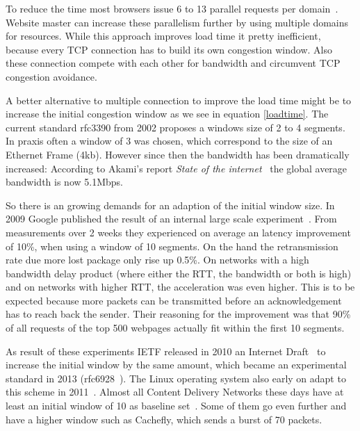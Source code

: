 To reduce the time most browsers issue 6 to 13 parallel requests per
domain~\cite{browserscope}. Website master can increase these parallelism
further by using multiple domains for resources. While this approach improves
load time it pretty inefficient, because every TCP connection has to build its
own congestion window. Also these connection compete with each other for
bandwidth and circumvent TCP congestion avoidance.

A better alternative to multiple connection to improve the load time might be to
increase the initial congestion window as we see in equation \ref{loadtime}. The
current standard rfc3390 from 2002 proposes a windows size of 2 to 4 segments.
In praxis often a window of 3 was chosen, which correspond to the size of an
Ethernet Frame (4kb). However since then the bandwidth has been dramatically
increased: According to Akami's report \emph{State of the
internet}~\cite{q3-2015-soti-connectivity-final} the global average bandwidth is
now 5.1Mbps.

So there is an growing demands for an adaption of the initial window size. In
2009 Google published the result of an internal large scale
experiment~\cite{36640}. From measurements over 2 weeks they experienced on
average an latency improvement of 10\%, when using a window of 10 segments. On
the hand the retransmission rate due more lost package only rise up 0.5\%. On
networks with a high bandwidth delay product (where either the RTT, the
bandwidth or both is high) and on networks with higher RTT, the acceleration was
even higher. This is to be expected because more packets can be transmitted
before an acknowledgement has to reach back the sender. Their reasoning for the
improvement was that 90\% of all requests of the top 500 webpages actually fit
within the first 10 segments.

As result of these experiments IETF released in 2010 an Internet
Draft~\cite{draft-ietf-tcpm-initcwnd-00} to increase the initial window by the
same amount, which became an experimental standard in 2013
(rfc6928~\cite{rfc6928}). The Linux operating system also early on adapt to this
scheme in 2011~\cite{linux}. Almost all Content Delivery Networks these days
have at least an initial window of 10 as baseline set~\cite{cdnplanet}. Some of
them go even further and have a higher window such as Cachefly, which sends a
burst of 70 packets.
